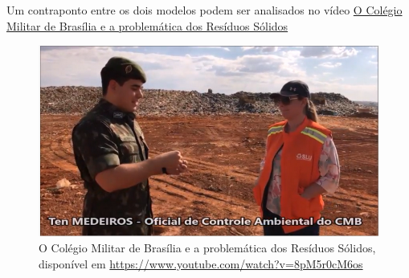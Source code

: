 Um contraponto entre os dois modelos podem ser analisados no vídeo \href{https://www.youtube.com/watch?v=8pM5r0cM6os}{O Colégio Militar de Brasília e a problemática dos Resíduos Sólidos}

\begin{figure}[h!]
    \centering
    \includegraphics[width=0.7\linewidth]{fig/Colegio-Militar-no-Aterro}
    \caption{O Colégio Militar de Brasília e a problemática dos Resíduos Sólidos, disponível em \url{https://www.youtube.com/watch?v=8pM5r0cM6os}}
    \label{fig:colegio-militar-no-aterro}
\end{figure}

